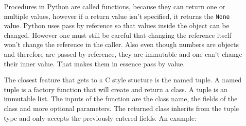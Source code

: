 Procedures in Python are called functions, because they can return one or multiple values, however if a return value isn't specified, it returns the \texttt{None} value. Python uses pass by reference so that values inside the object can be changed. However one must still be careful that changing the reference itself won't change the reference in the caller. Also even though numbers are objects and therefore are passed by reference, they are immutable and one can't change their inner value. That makes them in essence pass by value.

The closest feature that gets to a C style stucture is the named tuple. A named tuple is a factory function that will create and return a class. A tuple is an immutable list. The inputs of the function are the class name, the fields of the class and more optional parameters. The returned class inherits from the tuple type and only accepts the previously entered fields. An example:

